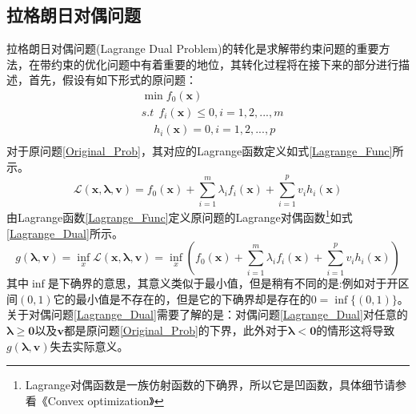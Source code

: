 \subsection{拉格朗日对偶问题}
\label{sec:Lagrange_prob}
拉格朗日对偶问题(Lagrange Dual Problem)的转化是求解带约束问题的重要方法，在带约束的优化问题中有着重要的地位，其转化过程将在接下来的部分进行描述，首先，假设有如下形式的原问题：
\begin{equation}
\label{Original_Prob}
\begin{split}
&\min f_0(\bm{x})\\
&s.t~~f_i(\bm{x})\leq 0,i=1,2,...,m\\
&~~~~~h_i(\bm{x}) =0,i=1,2,...,p\\
\end{split}
\end{equation}
对于原问题\ref{Original_Prob}，其对应的Lagrange函数定义如式\ref{Lagrange_Func}所示。
\begin{equation}
\label{Lagrange_Func}
\mathcal{L}(\bm{x},\bm{\lambda},\bm{v})=f_0(\bm{x})+\sum_{i=1}^{m}\lambda_i f_i(\bm{x})+\sum_{i=1}^{p}v_ih_i(\bm{x})
\end{equation}
由Lagrange函数\ref{Lagrange_Func}定义原问题的Lagrange对偶函数\footnote{Lagrange对偶函数是一族仿射函数的下确界，所以它是凹函数，具体细节请参看《Convex optimization》}如式\ref{Lagrange_Dual}所示。
\begin{equation}
\label{Lagrange_Dual}
g(\bm{\lambda},\bm{v})=\inf_{x}\mathcal{L}(\bm{x},\bm{\lambda},\bm{v})=\inf_{x}\left(f_0(\bm{x})+\sum_{i=1}^{m}\lambda_i f_i(\bm{x})+\sum_{i=1}^{p}v_ih_i(\bm{x})\right)
\end{equation}
其中$\inf$是下确界的意思，其意义类似于最小值，但是稍有不同的是:例如对于开区间$(0,1)$它的最小值是不存在的，但是它的下确界却是存在的$0=\inf\{(0,1)\}$。关于对偶问题\ref{Lagrange_Dual}需要了解的是：对偶问题\ref{Lagrange_Dual}对任意的$\bm{\lambda} \geq \bm{0}$以及$\bm{v}$都是原问题\ref{Original_Prob}的下界，此外对于$\bm{\lambda} < \bm{0}$的情形这将导致$g(\bm{\lambda},\bm{v})$失去实际意义。

